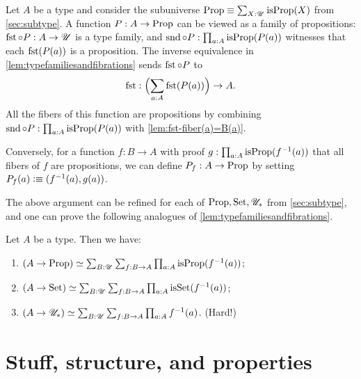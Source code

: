 Let $A$ be a type and consider the subuniverse 
$\Prop\jdeq \sum_{X:\UU}\isprop(X)$ from \cref{sec:subtype}.
A function $P: A\to\mathrm{Prop}$ can be viewed as a family of propositions:
$\fst\circ P : A\to \UU$ is a type family, and
$\snd\circ P : \prod_{a:A} \isprop(P(a))$ witnesses
that each $\fst(P(a))$ is a proposition.
The inverse equivalence in \cref{lem:typefamiliesandfibrations}
sends $\fst\circ P$ to
\[
  \fst: \Bigl(\sum_{a:A} \fst(P(a))\Bigr) \to A.
\]
All the fibers of this function are propositions by combining
$\snd\circ P : \prod_{a:A} \isprop(P(a))$
with \cref{lem:fst-fiber(a)=B(a)}.

Conversely,
for a function $f: B\to A$ with proof
$g:\prod_{a:A} \isprop(f^{-1}(a))$ that all fibers of $f$
are propositions,
we can define $P_f : A\to\mathrm{Prop}$ by setting $P_f(a)\defeq (f^{-1}(a),g(a))$.

The above argument can be refined for each of $\mathrm{Prop},\mathrm{Set},{\mathscr{U}_*}$
from \cref{sec:subtype}, and one can prove the following
analogues of \cref{lem:typefamiliesandfibrations}.

\begin{lemma}\label{lem:Prop-Set-pointed-families}
Let $A$ be a type. Then we have:
\begin{enumerate}
\item $(A\to\Prop) \equiv \sum_{B:\UU}\sum_{f:B\to A}
\prod_{a:A}\isprop({f^{-1}(a)})$;
\item \label{lem:Set-families}
$(A\to\Set) \equiv \sum_{B:\UU}\sum_{f:B\to A}
\prod_{a:A}\isset({f^{-1}(a)})$;
\item $(A\to{\mathscr{U}_*}) \simeq \sum_{B:{\mathscr{U}}}\sum_{f:B\to A}
\prod_{a:A}f^{-1}(a)$. (Hard!)
\end{enumerate}
\end{lemma}

\section{Stuff, structure, and properties}
\label{sec:stuff-struct-prop}

